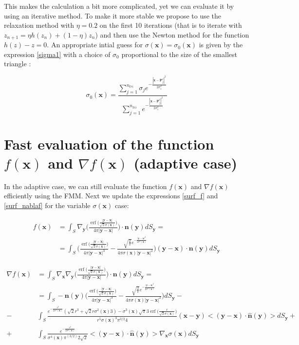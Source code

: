 \documentclass[11pt, oneside]{article}
\DeclareMathOperator\erf{erf}
\newcommand\bx{\boldsymbol x}
\newcommand\by{\boldsymbol y}
\newcommand\bn{\boldsymbol n}
\newcommand\bP{\boldsymbol P}
\begin{document}
This makes the calculation a bit more complicated, yet we can evaluate it by using an iterative method. To make it more stable we propose to use the relaxation method with $\eta=0.2$ on the first 10 iterations (that is to iterate with $z_{n+1}=\eta h(z_n)+(1-\eta)z_n$) and then use the Newton method for the function $h(z)-z=0$. An appropriate intial guess for $\sigma(\bx)=\sigma_0(\bx)$ is given by the expression \ref{sigma1} with a choice of $\sigma_0$ proportional to the size of the smallest triangle :
 
\begin{equation}\label{sigma0}
\sigma_0(\bx)=\frac{\sum_{j=1}^{n_{tri}}\sigma_je^{- \frac{|\bx-\bP_j^c|^2}{2\sigma^2_1}}}{\sum_{j=1}^{n_{tri}}e^{-\frac{|\bx-\bP_j^c|^2}{2\sigma^2_1}}}
\end{equation}

\section{Fast evaluation of the function $f(\bx)$ and $\nabla f(\bx)$ (adaptive case)}

In the adaptive case, we can still evaluate the function $f(\bx)$ and $\nabla f(\bx)$ efficiently using the FMM. Next we update the expressions \ref{surf_f} and \ref{surf_nablaf} for the variable $\sigma(\bx)$ case:

 
\begin{equation}
\begin{aligned}
f(\bx)&=\int_{\mathit{S}}\nabla_{\by}\Big(\frac{\erf\big(\frac{|\by-\bx|}{\sqrt{2}\sigma(\bx)}\big)}{4\pi|\by-\bx|}\Big)\cdot\bn(\by)dS_{\by}=\\
&=\int_{\mathit{S}}\Bigg(\frac{\erf\big(\frac{|\by-\bx|}{\sqrt{2}\sigma(\bx)}\big)}{4\pi|\by-\bx|^3}-\frac{\sqrt{\frac{2}{\pi}}e^{-\frac{|\by-\bx|^2}{2\sigma^2(\bx)}}}{4\pi\sigma(\bx)|\by-\bx|^2}\Bigg)(\by-\bx)\cdot\bn(\by)dS_{\by}
\end{aligned}
\end{equation}

\begin{equation}
\begin{aligned}
\nabla f(\bx)&=\int_{\mathit{S}}\nabla_{\bx}\nabla_{\by}\Big(\frac{\erf\big(\frac{|\by-\bx|}{\sqrt{2}\sigma(\bx)}\big)}{4\pi|\by-\bx|}\Big)\cdot\bn(\by)dS_{\by}=\\
&=\int_{\mathit{S}}-\bn(\by)\Bigg(\frac{\erf\big(\frac{|\by-\bx|}{\sqrt{2}\sigma(\bx)}\big)}{4\pi|\by-\bx|^3}-\frac{\sqrt{\frac{2}{\pi}}e^{-\frac{|\by-\bx|^2}{2\sigma^2(\bx)}}}{4\pi\sigma(\bx)|\by-\bx|^2}\Bigg)dS_{\by}-\\
-&\int_{\mathit{S}} \frac{e^{-\frac{r^2}{2\sigma^2(\bx)}}(\sqrt{2}r^3+\sqrt{2}r\sigma^2(\bx)3)-\sigma^3(\bx)\sqrt{\pi}3\erf{\big(\frac{r}{\sqrt{2}\sigma(\bx)}}\big)}{r^5\sigma(\bx)^3\pi^{3/2}4}(\bx-\by)<(\by-\bx)\cdot \hat{\bn}(\by)>dS_{\by}+\\
+&\int_{\mathit{S}} \frac{e^{-\frac{r^2}{2\sigma^2(\bx)}}}{\sigma^4(\bx)\pi^(3/2)2\sqrt{2}}<(\by-\bx)\cdot \hat{\bn}(\by)>\nabla_{\bx}\sigma(\bx)dS_{\by}
\end{aligned}
\end{equation}
\end{document}
